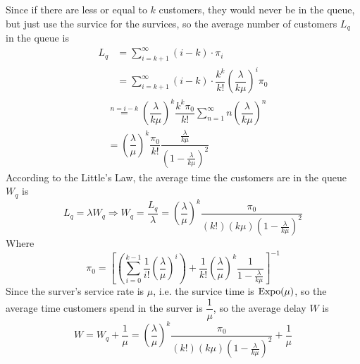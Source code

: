 \begin{homeworkProblem}
Since if there are less or equal to $k$ customers, they would never be in the queue, but just use the survice for the survices, so the average number of customers $L_q$ in the queue is
\begin{align*}
L_q &= \sum_{i=k+1}^{\infty}(i-k)\cdot\pi_i \\
&= \sum_{i=k+1}^{\infty}(i-k)\cdot\dfrac{k^k}{k!}\left(\dfrac{\lambda}{k\mu}\right)^i\pi_0
\end{align*}
\begin{align*}
&\stackrel{n=i-k}{=} \left(\dfrac{\lambda}{k\mu}\right)^k\dfrac{k^k\pi_0}{k!}\sum_{n=1}^{\infty}n\left(\dfrac{\lambda}{k\mu}\right)^n \\
&= \left(\dfrac{\lambda}{\mu}\right)^k\dfrac{\pi_0}{k!}\dfrac{\frac{\lambda}{k\mu}}{(1-\frac{\lambda}{k\mu})^2}
\end{align*}
According to the Little's Law, the average time the customers are in the queue $W_q$ is
$$L_q=\lambda W_q\Rightarrow W_q=\dfrac{L_q}{\lambda} = \left(\dfrac{\lambda}{\mu}\right)^k\dfrac{\pi_0}{(k!)(k\mu)(1-\frac{\lambda}{k\mu})^2}$$
Where
$$\pi_0 = \left[\left(\sum_{i=0}^{k-1}\dfrac{1}{i!}\left(\dfrac{\lambda}{\mu}\right)^i\right)+\dfrac{1}{k!}\left(\dfrac{\lambda}{\mu}\right)^k\dfrac{1}{1-\frac{\lambda}{k\mu}}\right]^{-1}$$
Since the surver's service rate is $\mu$, i.e. the survice time is $\operatorname{Expo}(\mu)$, so the average time customers spend in the surver is $\dfrac{1}{\mu}$, so the average delay $W$ is
$$W=W_q+\dfrac{1}{\mu}= \left(\dfrac{\lambda}{\mu}\right)^k\dfrac{\pi_0}{(k!)(k\mu)(1-\frac{\lambda}{k\mu})^2}+\dfrac{1}{\mu}$$


\end{homeworkProblem}
